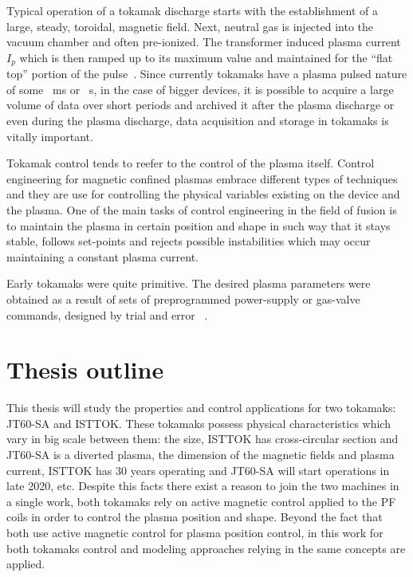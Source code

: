 Typical operation of a tokamak discharge starts with the establishment of a large, steady, toroidal, magnetic field. Next, neutral gas is injected into the vacuum chamber and often pre-ionized. The transformer induced plasma current $I_p$ which is then ramped up to its maximum value and maintained for the “flat top” portion of the pulse~\cite[Chapter~13]{Freidberg2007}. Since currently tokamaks have a plasma pulsed nature of some ~ms or ~s, in the case of bigger devices, it is possible to acquire a large volume of data over short periods and archived it after the plasma discharge or even during the plasma discharge, data acquisition and storage in tokamaks is vitally important. \smallskip

Tokamak control tends to reefer to the control of the plasma itself. Control engineering for magnetic confined plasmas  embrace different types of techniques and they are use for  controlling the  physical variables existing on the device and the plasma. One of the main tasks of control engineering in the field of fusion is to maintain the plasma in certain position and shape in such way that it stays stable, follows set-points and rejects possible instabilities which may occur maintaining a constant plasma current. \smallskip

Early tokamaks were quite primitive. The desired plasma parameters were obtained as a result of sets of preprogrammed power-supply or gas-valve commands, designed by trial and error~\cite{Lister1999} .


\section{Thesis outline}

This thesis will study the properties and control applications for two tokamaks: JT60-SA and ISTTOK. These tokamaks possess physical characteristics which vary in big scale between them: the size, ISTTOK has cross-circular section and JT60-SA is a diverted plasma, the dimension of the magnetic fields and plasma current, ISTTOK has 30 years operating and JT60-SA will start operations in late 2020, etc. Despite this facts there exist a reason to join the two machines in a single work, both tokamaks rely on active magnetic control applied to the PF coils in order to control the plasma position and shape. Beyond the fact that both use active magnetic control for plasma position control, in this work for both tokamaks control and modeling approaches relying in the same concepts are applied.   \smallskip

